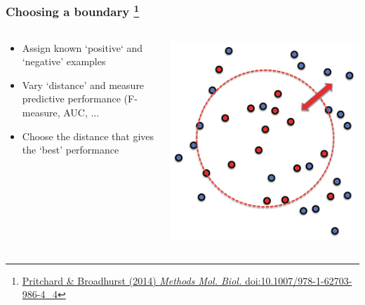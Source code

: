 \begin{frame}
  \frametitle{Choosing a boundary
  \footnote{\tiny{\href{http://dx.doi.org/10.1007/978-1-62703-986-4_4}{Pritchard \& Broadhurst (2014) \textit{Methods Mol. Biol.} doi:10.1007/978-1-62703-986-4\_4}}}
}
  \begin{columns}[T]
    \begin{column}{5cm}  
      \begin{itemize}  
        \item \textcolor{hutton_green}{Assign known `positive` and `negative' examples}
        \item \textcolor{hutton_blue}{Vary `distance' and measure predictive performance (F-measure, AUC, $\ldots$}
        \item \textcolor{hutton_purple}{Choose the distance that gives the `best' performance}
        \end{itemize}  
      \end{column}
    \begin{column}{5cm}  
      \includegraphics[width=1\textwidth]{images/finding_effectors11}    
    \end{column}
  \end{columns} 
\end{frame}

